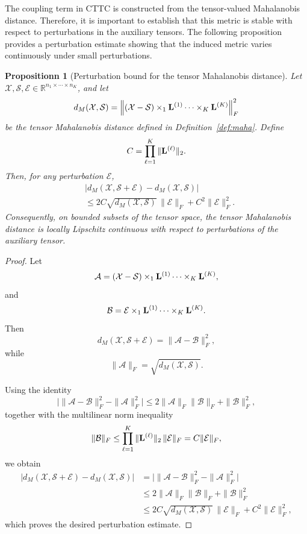 \documentclass{article}
\newcommand{\T}{\mathcal}
\newcommand{\m}[1]{{\bf{#1}}}
\newtheorem{proposition}{Propositionn}
\begin{document}
	The coupling term in CTTC is constructed from the tensor-valued Mahalanobis distance. Therefore, it is important to establish that this metric is stable with respect to perturbations in the auxiliary tensors. The following proposition provides a perturbation estimate showing that the induced metric varies continuously under small perturbations.


\begin{proposition}[Perturbation bound for the tensor Mahalanobis distance]
	\label{prop:perturb}
	Let $\T X,\T S,\T E\in
	\mathbb R^{n_1\times\cdots\times n_K}$, and let
	\[
	d_M(\T X,\T S)
	=
	\Big\|
	(\T X-\T S)
	\times_1\m L^{(1)}
	\cdots
	\times_K\m L^{(K)}
	\Big\|_F^2
	\]
	be the tensor Mahalanobis distance defined in
	Definition~\ref{def:maha}. Define
	\[
	C=\prod_{\ell=1}^K\|\m L^{(\ell)}\|_2.
	\]
	Then, for any perturbation $\T E$,
	\[
	\begin{aligned}
		&
		\left|
		d_M(\T X,\T S+\T E)
		-
		d_M(\T X,\T S)
		\right|
		\\
		&\le
		2C
		\sqrt{d_M(\T X,\T S)}
		\,\|\T E\|_F
		+
		C^2
		\|\T E\|_F^2.
	\end{aligned}
	\]
Consequently, on bounded subsets of the tensor space, the tensor Mahalanobis distance is locally Lipschitz continuous with respect to perturbations of the auxiliary tensor.
\end{proposition}
\begin{proof}
	Let
	\[
	\T A=
	(\T X-\T S)
	\times_1\m L^{(1)}
	\cdots
	\times_K\m L^{(K)},
	\]
	and
	\[
	\T B=
	\T E
	\times_1\m L^{(1)}
	\cdots
	\times_K\m L^{(K)}.
	\]
	Then
	\[
	d_M(\T X,\T S+\T E)
	=
	\|\T A-\T B\|_F^2,
	\]
	while
	\[
	\|\T A\|_F
	=
	\sqrt{d_M(\T X,\T S)}.
	\]
	
	Using the identity
	\[
	\bigl|
	\|\T A-\T B\|_F^2-\|\T A\|_F^2
	\bigr|
	\le
	2\|\T A\|_F\|\T B\|_F+\|\T B\|_F^2,
	\]
	together with the multilinear norm inequality
	\[
	\|\T B\|_F
	\le
	\prod_{\ell=1}^K
	\|\m L^{(\ell)}\|_2
	\,
	\|\T E\|_F
	=
	C\|\T E\|_F,
	\]
	we obtain
	\[
	\begin{aligned}
		\left|
		d_M(\T X,\T S+\T E)
		-
		d_M(\T X,\T S)
		\right|
		&=
		\bigl|
		\|\T A-\T B\|_F^2-\|\T A\|_F^2
		\bigr|\\
		&\le
		2\|\T A\|_F\|\T B\|_F+\|\T B\|_F^2\\
		&\le
		2C\sqrt{d_M(\T X,\T S)}\,\|\T E\|_F
		+
		C^2\|\T E\|_F^2,
	\end{aligned}
	\]
	which proves the desired perturbation estimate.
	\end{proof}
\end{document}
